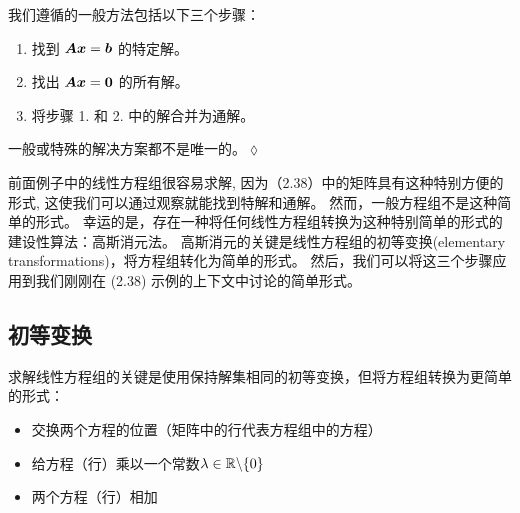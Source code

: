 \begin{remark}
    我们遵循的一般方法包括以下三个步骤：
    \begin{enumerate}
        \item 找到 $\boldsymbol{A}\boldsymbol{x} = \boldsymbol{b}$ 的特定解。
        \item 找出 $\boldsymbol{A}\boldsymbol{x} = \boldsymbol{0}$ 的所有解。
        \item 将步骤 1. 和 2. 中的解合并为通解。
    \end{enumerate}
\end{remark}
一般或特殊的解决方案都不是唯一的。\hfill$\lozenge$

前面例子中的线性方程组很容易求解,
因为（2.38）中的矩阵具有这种特别方便的形式,
这使我们可以通过观察就能找到特解和通解。
然而，一般方程组不是这种简单的形式。
幸运的是，存在一种将任何线性方程组转换为这种特别简单的形式的建设性算法：高斯消元法。
高斯消元的关键是线性方程组的初等变换(elementary transformations)，将方程组转化为简单的形式。
然后，我们可以将这三个步骤应用到我们刚刚在 (2.38) 示例的上下文中讨论的简单形式。

\subsection{初等变换}

求解线性方程组的关键是使用保持解集相同的初等变换，但将方程组转换为更简单的形式：
\begin{itemize}
    \item 交换两个方程的位置（矩阵中的行代表方程组中的方程）
    \item 给方程（行）乘以一个常数$\lambda \in \mathbb{R} \backslash \{0\}$
    \item 两个方程（行）相加
\end{itemize}

